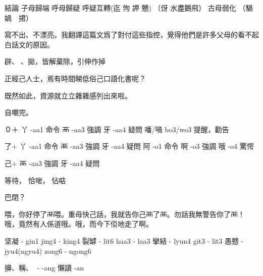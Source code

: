 結論
子母歸端
呼母歸疑 呼疑互轉(迄 怐 䛅 戇) （伢 水盡鵝飛）
古母弱化 （騧　媧　捃）

寫不出、不漂亮。我翻譯這篇文爲了對付這些指控，覺得他們是許多父母的看不起白話文的原因。

辟、𠌸、拋，皆解棄除，引伸作掉

正經己人士，焉有時間睇低俗己口語化書呢？

既然如此，資源就立立雜雜感列出來啦。

自嘲完。

０＋
丫	-aa1	命令
襾	-aa3	強調
牙	-aa4	疑問
噃/喎	bo3/wo3	提醒，勸告


了+
丫	-aa1	命令
襾	-aa3	強調
牙	-aa4	疑問
阿	-o1	命令
啊	-o3	強調
哦	-o4	驚愕


己+
襾	-aa3	強調
牙	-aa4	疑問

等待， 恰啱， 怗𠶧

巴閉？

喂，你好停了襾喂。重毋快己話，我就告你己襾了襾。勿話我無警告你了襾！
哦，竟然有人係道哦。哦，而今下佢地走了啊。

坚凝 - gin1 jing4 - king4
裂罅 - lit6 haa3 - laa3
攣結 - lyun4 git3 - lit3
愚戆 - jyu4(ngyu4) zong6 - ngong6

擤、稱、𨆐 - -ang 懶讀 -an